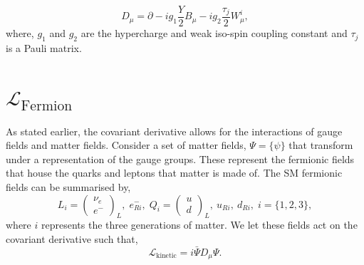 \begin{equation}
    D_\mu = \partial - i g_1 \frac{Y}{2}B_\mu - i g_2 \frac{\tau_j}{2} W_{\mu}^{i},
\end{equation}
where, $g_1$ and $g_2$ are the hypercharge and weak iso-spin coupling constant and $\tau_j$ is a Pauli matrix.

 \section{$\mathcal{L}_\text{Fermion}$}
 As stated earlier, the covariant derivative allows for the interactions of gauge fields and matter fields. Consider a set of matter fields, $\Psi=\{\psi\}$ that transform under a representation of the gauge groups. These represent the fermionic fields that house the quarks and leptons that  matter is made of. The SM fermionic fields can be summarised by,
\begin{equation}\label{lepsandqs}
    L_i= \begin{pmatrix} \nu_e \\ 
    e^- \end{pmatrix}_L,\; e^-_{Ri}, \; Q_i= \begin{pmatrix} u \\ d \end{pmatrix}_L, \: u_{Ri}, \: d_{Ri},\;  i=\{1,2,3\},
\end{equation}
where $i$ represents the three generations of matter. We let these fields act on the covariant derivative such that,
\begin{equation}
     \mathcal{L}_\text{kinetic} = i \bar{\Psi}D_\mu \Psi.
\end{equation}
